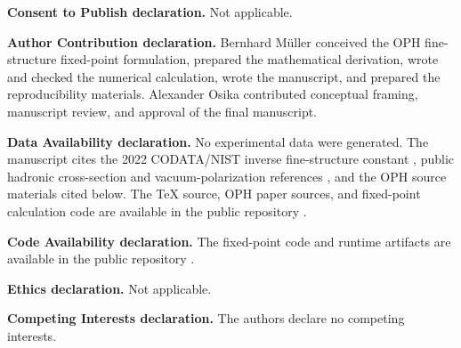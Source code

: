\documentclass[11pt]{article}
\theoremstyle{remark}
\begin{document}
\textbf{Consent to Publish declaration.} Not applicable.

\textbf{Author Contribution declaration.} Bernhard M\"uller conceived the OPH fine-structure fixed-point formulation, prepared the mathematical derivation, wrote and checked the numerical calculation, wrote the manuscript, and prepared the reproducibility materials. Alexander Osika contributed conceptual framing, manuscript review, and approval of the final manuscript.

\textbf{Data Availability declaration.} No experimental data were generated. The manuscript cites the 2022 CODATA/NIST inverse fine-structure constant \cite{nist-value,nist-2022}, public hadronic cross-section and vacuum-polarization references \cite{pdg-xsect,dhmz,knt19}, and the OPH source materials cited below. The TeX source, OPH paper sources, and fixed-point calculation code are available in the public repository \cite{oph-code}.

\textbf{Code Availability declaration.} The fixed-point code and runtime artifacts are available in the public repository \cite{oph-code}.

\textbf{Ethics declaration.} Not applicable.

\textbf{Competing Interests declaration.} The authors declare no competing interests.
\end{document}
